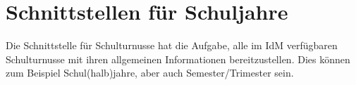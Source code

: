 \section{Schnittstellen für Schuljahre}
Die Schnittstelle für Schulturnusse hat die Aufgabe, alle im IdM verfügbaren Schulturnusse mit ihren allgemeinen Informationen bereitzustellen. Dies können zum Beispiel Schul(halb)jahre, aber auch Semester/Trimester sein.


%

%
%
